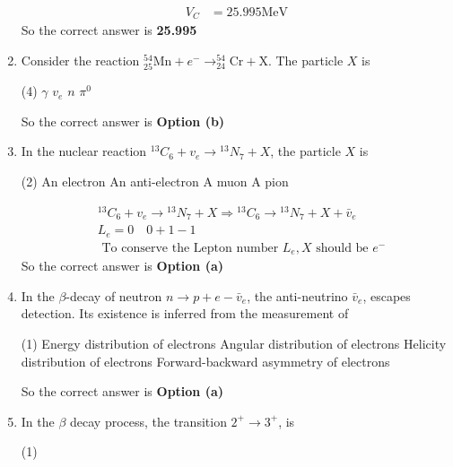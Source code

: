 \begin{enumerate}
\begin{answer}
\begin{align*}
		V_C&=25.995 \mathrm{MeV}
		\end{align*}
		So the correct answer is \textbf{25.995}
	\end{answer}
	\item Consider the reaction ${ }_{25}^{54} \mathrm{Mn}+e^{-} \rightarrow_{24}^{54} \mathrm{Cr}+\mathrm{X}$. The particle $X$ is
	{}
	\begin{tasks}(4)
		\task[\textbf{a.}]$\gamma$
		\task[\textbf{b.}]$v_e$
		\task[\textbf{c.}]$n$
		\task[\textbf{d.}]$\pi^0$ 
	\end{tasks}
	\begin{answer}
		So the correct answer is \textbf{Option (b)}
	\end{answer}
	\item In the nuclear reaction ${ }^{13} C_6+v_e \rightarrow{ }^{13} N_7+X$, the particle $X$ is
	{}
	\begin{tasks}(2)
		\task[\textbf{a.}]An electron
		\task[\textbf{b.}]An anti-electron
		\task[\textbf{c.}]A muon
		\task[\textbf{d.}]A pion 
	\end{tasks}
	\begin{answer}
		\begin{align*}
		&{ }^{13} C_6+v_e \rightarrow{ }^{13} N_7+X \Rightarrow{ }^{13} C_6 \rightarrow{ }^{13} N_7+X+\bar{v}_e\\
		& L_e=0 \quad 0+1-1\\
		&\text { To conserve the Lepton number } L_e, X \text { should be } e^{-}
		\end{align*}
		So the correct answer is \textbf{Option (a)}
	\end{answer}
	\item In the $\beta$-decay of neutron $n \rightarrow p+e-\bar{v}_e$, the anti-neutrino $\bar{v}_e$, escapes detection. Its existence is inferred from the measurement of
	{}
	\begin{tasks}(1)
		\task[\textbf{a.}]Energy distribution of electrons
		\task[\textbf{b.}]Angular distribution of electrons
		\task[\textbf{c.}]Helicity distribution of electrons
		\task[\textbf{d.}]Forward-backward asymmetry of electrons 
	\end{tasks}
	\begin{answer}
		So the correct answer is \textbf{Option (a)}
	\end{answer}
	\item In the $\beta$ decay process, the transition $2^{+} \rightarrow 3^{+}$, is
	{}
	\begin{tasks}(1)

\end{tasks}
\end{enumerate}
